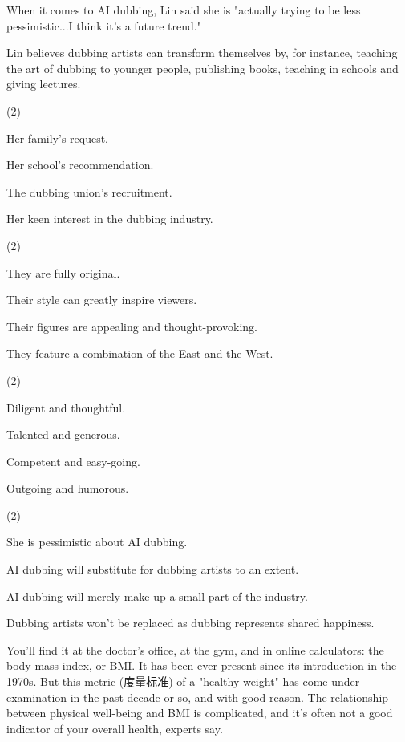 \documentclass{英语试卷}
\begin{document}
\par When it comes to AI dubbing, Lin said she is "actually trying to be less pessimistic...I think it's a future trend."\par
\par Lin believes dubbing artists can transform themselves by, for instance, teaching the art of dubbing to younger people, publishing books, teaching in schools and giving lectures.\par
{}
\begin{choices}(2)
  \item Her family's request.
  \item Her school's recommendation.
  \item The dubbing union's recruitment.
  \item Her keen interest in the dubbing industry.
\end{choices}
\begin{choices}(2)
  \item They are fully original.
  \item Their style can greatly inspire viewers.
  \item Their figures are appealing and thought-provoking.
  \item They feature a combination of the East and the West.
\end{choices}
\begin{choices}(2)
  \item Diligent and thoughtful.
  \item Talented and generous.
  \item Competent and easy-going.
  \item Outgoing and humorous.
\end{choices}
\begin{choices}(2)
  \item She is pessimistic about AI dubbing.
  \item AI dubbing will substitute for dubbing artists to an extent.
  \item AI dubbing will merely make up a small part of the industry.
  \item Dubbing artists won't be replaced as dubbing represents shared happiness.
\end{choices}
\par You'll find it at the doctor's office, at the gym, and in online calculators: the body mass index, or BMI. It has been ever-present since its introduction in the 1970s. But this metric (度量标准) of a "healthy weight" has come under examination in the past decade or so, and with good reason. The relationship between physical well-being and BMI is complicated, and it's often not a good indicator of your overall health, experts say.\par
\end{document}
